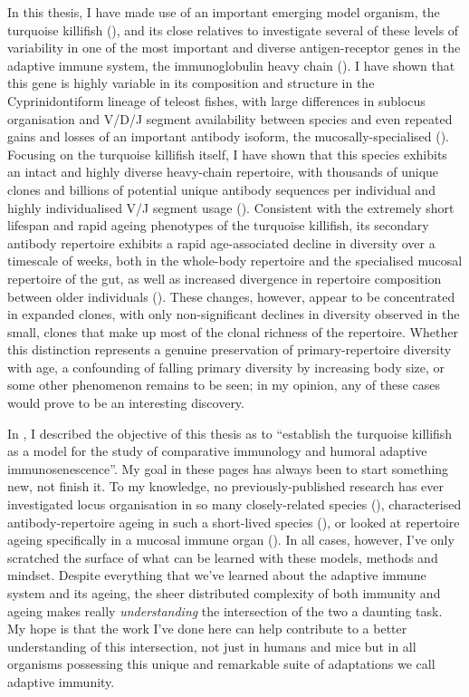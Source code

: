 In this thesis, I have made use of an important emerging model organism, the turquoise killifish (\nfu), and its close relatives to investigate several of these levels of variability in one of the most important and diverse antigen-receptor genes in the adaptive immune system, the immunoglobulin heavy chain (\igh{}). I have shown that this gene is highly variable in its composition and structure in the Cyprinidontiform lineage of teleost fishes, with large differences in sublocus organisation and V/D/J segment availability between species and even repeated gains and losses of an important antibody isoform, the mucosally-specialised  (). Focusing on the turquoise killifish itself, I have shown that this species exhibits an intact and highly diverse heavy-chain repertoire, with thousands of unique clones and billions of potential unique antibody sequences per individual and highly individualised V/J segment usage (). Consistent with the extremely short lifespan and rapid ageing phenotypes of the turquoise killifish, its secondary antibody repertoire exhibits a rapid age-associated decline in diversity over a timescale of weeks, both in the whole-body repertoire and the specialised mucosal repertoire of the gut, as well as increased divergence in repertoire composition between older individuals (). These changes, however, appear to be concentrated in expanded clones, with only non-significant declines in diversity observed in the small, \naive clones that make up most of the clonal richness of the repertoire. Whether this distinction represents a genuine preservation of primary-repertoire diversity with age, a confounding of falling primary diversity by increasing body size, or some other phenomenon remains to be seen; in my opinion, any of these cases would prove to be an interesting discovery.

In , I described the objective of this thesis as to ``establish the turquoise killifish as a model for the study of comparative immunology and humoral adaptive immunosenescence''. My goal in these pages has always been to start something new, not finish it. To my knowledge, no previously-published research has ever investigated \igh{} locus organisation in so many closely-related species (), characterised antibody-repertoire ageing in such a short-lived species (), or looked at repertoire ageing specifically in a mucosal immune organ (). In all cases, however, I've only scratched the surface of what can be learned with these models, methods and mindset. Despite everything that we've learned about the adaptive immune system and its ageing, the sheer distributed complexity of both immunity and ageing makes really \textit{understanding} the intersection of the two a daunting task. My hope is that the work I've done here can help contribute to a better understanding of this intersection, not just in humans and mice but in all organisms possessing this unique and remarkable suite of adaptations we call adaptive immunity.